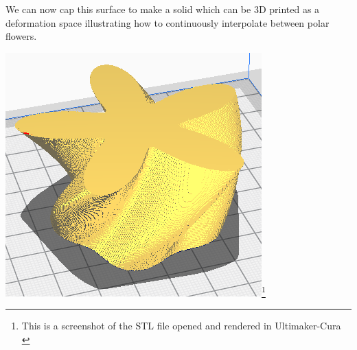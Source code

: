 \documentclass[12 pt]{article}
\begin{document}
We can now cap this surface to make a solid which can be 3D printed as a deformation space illustrating how to continuously interpolate between polar flowers.
\begin{center}
    \includegraphics[width=.35\paperwidth]{images/curaCropped.png}\footnote{This is a screenshot of the STL file opened and rendered in Ultimaker-Cura \cite{Cura}}\\
    \vspace{10pt}

\end{center}
\end{document}
